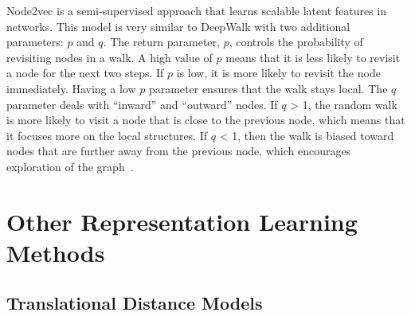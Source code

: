 \begin{figure}[ht!]
\end{figure}

Node2vec is a semi-supervised approach that learns scalable latent features in networks.
This model is very similar to DeepWalk with two additional parameters: $p$ and $q$.
The return parameter, $p$, controls the probability of revisiting nodes in a walk.
A high value of $p$ means that it is less likely to revisit a node for the next two steps.
If $p$ is low, it is more likely to revisit the node immediately.
Having a low $p$ parameter ensures that the walk stays local.
The $q$ parameter deals with “inward” and “outward” nodes.
If $q$ > 1, the random walk is more likely to visit a node that is close to the previous node, which means that it focuses more on the local structures.
If $q$ < 1, then the walk is biased toward nodes that are further away from the previous node, which encourages exploration of the graph~\cite{grover_node2vec:_2016}.

\section{Other Representation Learning Methods}

\subsection{Translational Distance Models}

